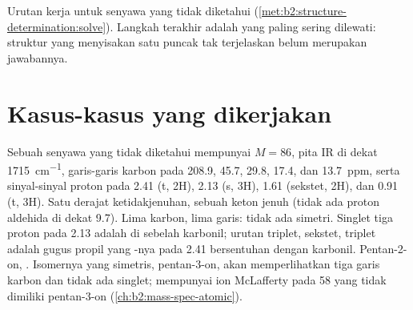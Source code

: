 \begin{omfigure}
\par\vspace{4pt}

{\small Urutan kerja untuk senyawa yang tidak diketahui
(\cref{met:b2:structure-determination:solve}). Langkah terakhir adalah yang
paling sering dilewati: struktur yang menyisakan satu puncak tak
terjelaskan belum merupakan jawabannya.}
\end{omfigure}

\section{Kasus-kasus yang dikerjakan}

\begin{example}\label{ex:b2:structure-determination:ketone}
Sebuah senyawa yang tidak diketahui mempunyai $M = 86$, pita IR di dekat
\qty{1715}{cm^{-1}}, garis-garis karbon pada 208.9, 45.7, 29.8, 17.4, dan
13.7~ppm, serta sinyal-sinyal proton pada 2.41 (t, 2H), 2.13 (s, 3H), 1.61
(sekstet, 2H), dan 0.91 (t, 3H). Satu derajat ketidakjenuhan, sebuah keton
jenuh (tidak ada proton aldehida di dekat 9.7). Lima karbon, lima garis:
tidak ada simetri. Singlet tiga proton pada 2.13 adalah  di sebelah
karbonil; urutan triplet, sekstet, triplet adalah gugus propil yang
-nya pada 2.41 bersentuhan dengan karbonil. Pentan-2-on,
. Isomernya yang simetris, pentan-3-on, akan
memperlihatkan tiga garis karbon dan tidak ada singlet; 
mempunyai ion McLafferty pada 58 yang tidak dimiliki pentan-3-on
(\cref{ch:b2:mass-spec-atomic}).
\end{example}

